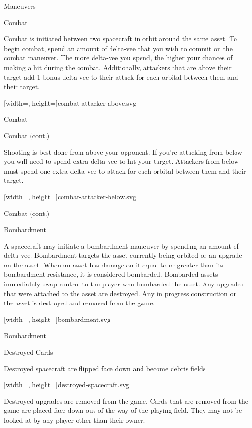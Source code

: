 \documentclass[twoside]{minimal}
\newenvironment{section}[1]
{\renewcommand{\title}{\begin{center} \fontsize{24.88}{32}\selectfont #1 \end{center}} \ignorespaces}
{\clearpage \ignorespacesafterend}
\newenvironment{supersection}[1]
{
\renewcommand{\title}{\begin{center} \fontsize{24.88}{32}\selectfont #1 \end{center}}
\renewenvironment{section}[1]
 {\title \renewcommand{\title}{\begin{flushleft} \fontsize{20.74}{28}\selectfont ##1 \end{flushleft}} \ignorespaces}
 {\clearpage \ignorespacesafterend}
\ignorespaces
}
{\clearpage \ignorespacesafterend}
\newcommand{\full}[3]{
\begin{diagram}
    \begin{center}
    {#2[width=\textwidth, height=\textheight]{#1}}
    \caption*{#3}
    \end{center}
\end{diagram}
}
\newcommand{\fullsvg}[2]{\full{#1}{}{#2}}
\begin{document}
\begin{supersection}{Maneuvers}
    \begin{section}{Combat}
        \title

        Combat is initiated between two spacecraft in orbit around the same asset.
        To begin combat, spend an amount of delta-vee that you wish to commit on the combat maneuver.
        The more delta-vee you spend, the higher your chances of making a hit during the combat.
        Additionally, attackers that are above their target add 1 bonus delta-vee to their attack for each orbital between them and their target.

        \fullsvg{combat-attacker-above.svg}{Combat with the attacker above its target.}
    \end{section}

    \begin{section}{Combat (cont.)}
        \title

        Shooting is best done from above your opponent.
        If you're attacking from below you will need to spend extra delta-vee to hit your target.
        Attackers from below must spend one extra delta-vee to attack for each orbital between them and their target.

        \fullsvg{combat-attacker-below.svg}{Combat with the attacker below its target.}
    \end{section}

    \begin{section}{Bombardment}
        \title

        A spacecraft may initiate a bombardment maneuver by spending an amount of delta-vee.
        Bombardment targets the asset currently being orbited or an upgrade on the asset.
        When an asset has damage on it equal to or greater than its bombardment resistance, it is considered bombarded.
        Bombarded assets immediately swap control to the player who bombarded the asset.
        Any upgrades that were attached to the asset are destroyed.
        Any in progress construction on the asset is destroyed and removed from the game.

        \fullsvg{bombardment.svg}{Asset bombardment.}

    \end{section}
\end{supersection}

\begin{section}{Destroyed Cards}
\title

Destroyed spacecraft are flipped face down and become debris fields

\fullsvg{destroyed-spacecraft.svg}{Flipping a spacecraft when it is destroyed}

Destroyed upgrades are removed from the game.
Cards that are removed from the game are placed face down out of the way of the playing field.
They may not be looked at by any player other than their owner.
\end{section}
\end{document}
